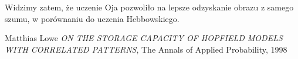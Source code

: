 \documentclass{article}
\begin{document}
Widzimy zatem, że uczenie Oja pozwoliło na lepsze odzyskanie obrazu z samego szumu,
w porównaniu do uczenia Hebbowskiego. 
\begin{thebibliography}{9}

    Matthias Lowe
    \textit{ON THE STORAGE CAPACITY OF HOPFIELD
    MODELS WITH CORRELATED PATTERNS},
    The Annals of Applied Probability, 1998
\end{thebibliography}
\end{document}
